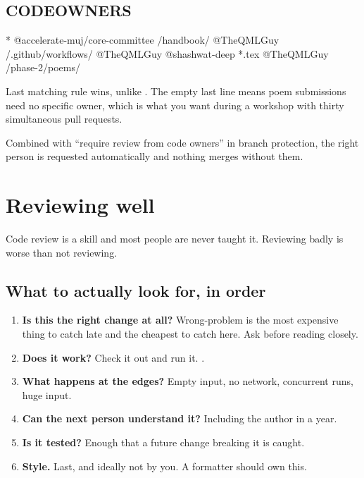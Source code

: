 \documentclass[11pt]{article}
\begin{document}
\subsection{CODEOWNERS}

\begin{terminal}
*                       @accelerate-muj/core-committee
/handbook/              @TheQMLGuy
/.github/workflows/     @TheQMLGuy @shashwat-deep
*.tex                   @TheQMLGuy
/phase-2/poems/
\end{terminal}

Last matching rule wins, unlike . The empty last line means poem
submissions need no specific owner, which is what you want during a workshop with
thirty simultaneous pull requests.

Combined with ``require review from code owners'' in branch protection, the right
person is requested automatically and nothing merges without them.

\section{Reviewing well}

Code review is a skill and most people are never taught it. Reviewing badly is worse
than not reviewing.

\subsection{What to actually look for, in order}

\begin{enumerate}
  \item \textbf{Is this the right change at all?} Wrong-problem is the most expensive
    thing to catch late and the cheapest to catch here. Ask before reading closely.
  \item \textbf{Does it work?} Check it out and run it. .
  \item \textbf{What happens at the edges?} Empty input, no network, concurrent runs,
    huge input.
  \item \textbf{Can the next person understand it?} Including the author in a year.
  \item \textbf{Is it tested?} Enough that a future change breaking it is caught.
  \item \textbf{Style.} Last, and ideally not by you. A formatter should own this.
\end{enumerate}
\end{document}

